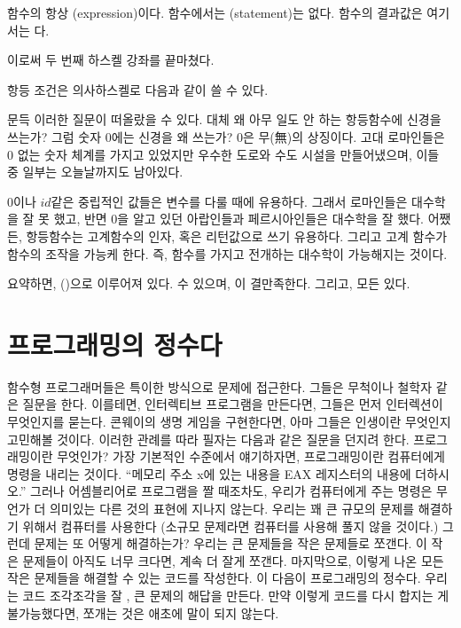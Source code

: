 함수의 \trFunctionBody\는 항상 \trExpression(expression)이다. 함수에서는 \trStatement(statement)는 없다. 
함수의 결과값은  여기서는 다.

이로써 두 번째 하스켈 강좌를 끝마쳤다.

항등 조건은 의사하스켈로 다음과 같이 쓸 수 있다.

문득 이러한 질문이 떠올랐을 수 있다. 대체 왜 아무 일도 안 하는 항등함수에 신경을 쓰는가?
그럼 숫자 0에는 신경을 왜 쓰는가? 0은 무(無)의 상징이다. 고대 로마인들은 0 없는 숫자 체계를 가지고 있었지만
우수한 도로와 수도 시설을 만들어냈으며, 이들 중 일부는 오늘날까지도 남아있다.

0이나 $id$같은 중립적인 값들은 \trSymbolic 변수를 다룰 때에 유용하다.
그래서 로마인들은 대수학을 잘 못 했고, 반면 0을 알고 있던 아랍인들과 페르시아인들은 대수학을 잘 했다.
어쨌든, 항등함수는 고계함수의 인자, 혹은 리턴값으로 쓰기 유용하다. 
그리고 고계 함수가 함수의  조작을 가능케 한다.
즉, 함수를 가지고 전개하는 대수학이 가능해지는 것이다.

요약하면,   \trArrow(\trMorphism)으로 이루어져 있다.
  수 있으며, 이  결 만족한다.
그리고, 모든    \trIdentity {} 있다.

\section{ 프로그래밍의 정수다}

함수형 프로그래머들은 특이한 방식으로 문제에 접근한다. 그들은 무척이나 철학자 같은 질문을 한다.
이를테면, 인터렉티브 프로그램을 만든다면, 그들은 먼저 인터렉션이 무엇인지를 묻는다.
콘웨이의 생명 게임을 구현한다면, 아마 그들은 인생이란 무엇인지 고민해볼 것이다.
이러한 관례를 따라 필자는 다음과 같은 질문을 던지려 한다. 프로그래밍이란 무엇인가?
가장 기본적인 수준에서 얘기하자면, 프로그래밍이란 컴퓨터에게 명령을 내리는 것이다.
``메모리 주소 x에 있는 내용을 EAX 레지스터의 내용에 더하시오.'' 
그러나 어셈블리어로 프로그램을 짤 때조차도, 우리가 컴퓨터에게 주는 명령은 무언가 더 의미있는 다른 것의 표현에 지나지 않는다.
우리는 꽤 큰 규모의 문제를 해결하기 위해서 컴퓨터를 사용한다 (소규모 문제라면 컴퓨터를 사용해 풀지 않을 것이다.)
그런데 문제는 또 어떻게 해결하는가? 우리는 큰 문제들을 작은 문제들로 쪼갠다. 
이 작은 문제들이 아직도 너무 크다면, 계속 더 잘게 쪼갠다.
마지막으로, 이렇게 나온 모든 작은 문제들을 해결할 수 있는 코드를 작성한다.
이 다음이 프로그래밍의 정수다.
우리는 코드 조각조각을 잘 , 큰 문제의 해답을 만든다. 
만약 이렇게 코드를 다시 합지는 게 불가능했다면, 쪼개는 것은 애초에 말이 되지 않는다.

